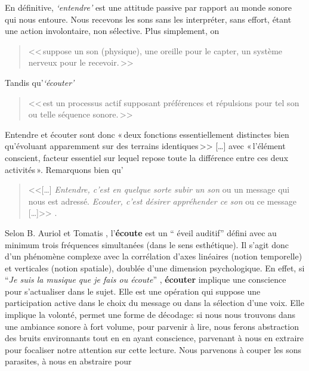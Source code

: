 En définitive, \emph{`entendre'} est une attitude passive par rapport au monde sonore
qui nous entoure. Nous recevons les sons sans les interpréter, sans
effort, étant une action involontaire, non
sélective. Plus simplement, on
\begin{quote}
	<<\,suppose un son (physique), une oreille
	pour le capter, un système nerveux pour le recevoir.\,>>\autocite[2]{auriol:cle}
 \end{quote}
 Tandis qu'\textit{`écouter'}
\begin{quote}
	<<\,est un
	processus actif supposant préférences et répulsions pour tel son ou
	telle séquence sonore.\,>>\autocite[2]{auriol:cle}

\end{quote}
Entendre et écouter sont donc  «\,deux
fonctions essentiellement distinctes bien qu'évoluant apparemment sur
des terrains iden\-ti\-ques\,>>
[\dots] avec «\,l'é\-lé\-ment cons\-cient, facteur essentiel sur lequel repose toute la
différence entre ces deux activités\,». \autocite[122]{tomatis_oreille_1987}
Remarquons bien qu'
\begin{quote}

	<<[\ldots] \emph{Entendre, c'est en quelque sorte subir
		un son} ou un message qui nous est adressé. \emph{Ecouter, c'est désirer appréhender ce son} ou ce message [\ldots]>>
	\autocite [p. 111]{tomatis:education}.
\end{quote}
Selon B. Auriol \autocite[18] {auriol:cle} et Tomatis \autocite[52]
{tomatis:loreille}, l'\textbf{écoute} est un `` éveil auditif''  défini avec au
minimum trois
fréquences simultanées (dans le sens esthétique). Il s'agit donc d'un phénomène
complexe avec la corrélation d'axes
linéaires (notion temporelle) et verticales (notion spatiale), doublée d'une
dimension psychologique.
En effet, si \enquote{\emph{Je suis la musique que je fais ou écoute}}
\autocite [8]{viret:b}, \textbf{écouter} implique une conscience pour s'actualiser dans le sujet.
Elle est une opération
qui suppose une participation active dans le choix du message
ou dans la sélection d'une voix. Elle  implique la volonté,
permet une forme de décodage:
si nous nous trouvons dans une ambiance sonore à fort volume, pour
parvenir à lire, nous
ferons abstraction des bruits environnants tout en en ayant
conscience, parvenant à nous en extraire pour focaliser notre
attention sur cette lecture. Nous parvenons à couper les sons parasites, à nous en abstraire pour
